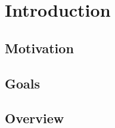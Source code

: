 \chapter{Introduction}
\label{ch:intro}


%
%
\section{Motivation}
\label{sec:intro:motivation}



%
%
\section{Goals}
\label{sec:intro:goals}



%
%
\section{Overview}
\label{sec:intro:overview}
